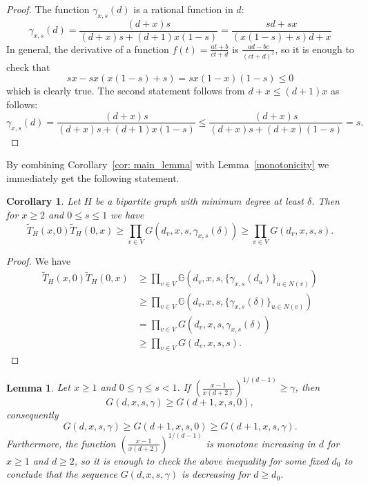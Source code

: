 \documentclass[12pt,a4paper]{amsart}
\numberwithin{equation}{section}
\theoremstyle{plain}
\newtheorem{Lemma}[Th]{Lemma}
\newtheorem{Cor}[Th]{Corollary}
\theoremstyle{definition}
\newcommand{\1}{\textbf{1}}
\begin{document}
\begin{proof}
The function $\gamma_{x,s}(d)$ is a rational function in $d$:
$$\gamma_{x,s}(d)=\frac{(d+x)s}{(d+x)s+(d+1)x(1-s)}=\frac{sd+ sx}{(x(1-s)+s)d+x}$$
In general, the derivative of a function $f(t)=\frac{at+b}{ct+d}$ is $\frac{ad-bc}{(ct+d)^2}$, so it is enough to check that
$$sx-sx(x(1-s)+s)=sx(1-x)(1-s)\leqslant 0$$
which is clearly true. The second statement follows from $d+x\leqslant (d+1)x$ as follows:
$$\gamma_{x,s}(d)=\frac{(d+x)s}{(d+x)s+(d+1)x(1-s)}\leqslant \frac{(d+x)s}{(d+x)s+(d+x)(1-s)}=s.$$
\end{proof}



By combining Corollary~\ref{cor: main_lemma} with Lemma~\ref{monotonicity} we immediately get the following statement.

\begin{Cor} \label{cor: main_lemma_2} 
Let $H$ be a bipartite graph with minimum degree at least $\delta$. Then for $x\geqslant 2$ and $0\leqslant s\leqslant 1$ we have
$$\widetilde{T}_H(x,0)\widetilde{T}_H(0,x)\geqslant \prod_{v\in V}G(d_v,x,s,\gamma_{x,s}(\delta))\geqslant \prod_{v\in V}G(d_v,x,s,s).$$
\end{Cor}

\begin{proof}
We have
\begin{align*}
\widetilde{T}_H(x,0)\widetilde{T}_H(0,x)&\geqslant \prod_{v\in V}\mathbb{G}\left(d_v,x,s,\{\gamma_{x,s}(d_u)\}_{u\in N(v)}\right)\\
&\geqslant \prod_{v\in V}\mathbb{G}\left(d_v,x,s,\{\gamma_{x,s}(\delta)\}_{u\in N(v)}\right)\\
&=\prod_{v\in V}G(d_v,x,s,\gamma_{x,s}(\delta))\\
&\geqslant \prod_{v\in V}G(d_v,x,s,s).
\end{align*}


\end{proof}

\begin{Lemma} \label{monotonicity2}
Let $x\geqslant 1$ and $0\leqslant \gamma \leqslant s<1$. If $\left(\frac{x-1}{x(d+2)}\right)^{1/(d-1)}\geqslant \gamma$, then
$$G(d,x,s,\gamma)\geqslant G(d+1,x,s,0),$$
consequently
$$G(d,x,s,\gamma)\geqslant G(d+1,x,s,0)\geqslant G(d+1,x,s,\gamma).$$
Furthermore, the function $\left(\frac{x-1}{x(d+2)}\right)^{1/(d-1)}$ is monotone increasing in $d$ for $x\geqslant 1$ and $d\geqslant 2$, so it is enough to check the above inequality for some fixed $d_0$ to conclude that the sequence $G(d,x,s,\gamma)$ is decreasing for $d\geqslant d_0$.
\end{Lemma}
\end{document}
